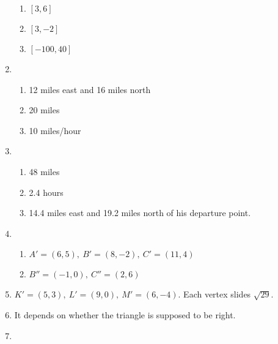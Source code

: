 \documentclass{article}
\begin{document}
\begin{enumerate}
\begin{enumerate}
	\item $[3, 6]$
	
	\item $[3, -2]$
	
	\item $[-100, 40]$
	
	\end{enumerate}
	
\item

	\begin{enumerate}
	
	\item 12 miles east and 16 miles north
	
	\item 20 miles
	
	\item 10 miles/hour
	
	\end{enumerate}
	
\item

	\begin{enumerate}
	
	\item 48 miles
	
	\item 2.4 hours
	
	\item 14.4 miles east and 19.2 miles north of his departure point.
	
	\end{enumerate}
	
\item

	\begin{enumerate}
	
	\item $A' = (6, 5), \ B' = (8, -2), \ C' = (11,4)$
	
	\item $B'' = (-1, 0), \ C'' = (2, 6)$
	
	\end{enumerate}
	
\item $K' = (5, 3), \ L' = (9, 0), \ M' = (6, -4)$. Each vertex slides $\sqrt{29}$.

\item It depends on whether the triangle is supposed to be right.

\item 

	\begin{enumerate}
	

\end{enumerate}
\end{enumerate}
\end{document}
